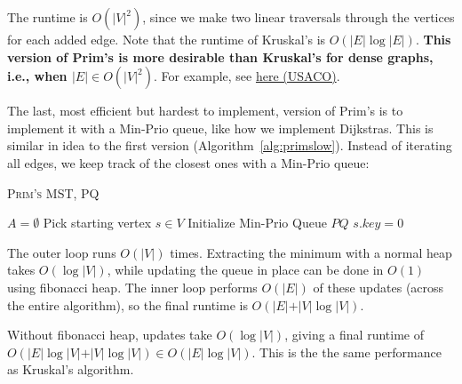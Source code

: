 The runtime is $O(\vert V\vert^2)$, since we make two linear traversals through the vertices for each added edge. Note that the runtime of Kruskal's is $O(\vert E\vert \log{\vert E\vert})$. \textbf{This version of Prim's is more desirable than Kruskal's for dense graphs, i.e., when $\vert E\vert \in O(\vert V\vert^2)$}. For example, see \href{http://www.usaco.org/current/data/sol_walk_gold_open19.html}{here (USACO)}. \V

The last, most efficient but hardest to implement, version of Prim's is to implement it with a Min-Prio queue, like how we implement Dijkstras. This is similar in idea to the first version (Algorithm~\ref{alg:primslow}). Instead of iterating all edges, we keep track of the closest ones with a Min-Prio queue:\medskip

\begin{algorithm}[H]
\DontPrintSemicolon
\SetNoFillComment

\caption{\textsc{Prim's MST, PQ}}\label{alg:primPQ}
$A = \emptyset$\;
Pick starting vertex $s\in V$\;
Initialize Min-Prio Queue $PQ$\;
$s.key=0$\;
\;
\end{algorithm}\medskip

The outer loop runs $O(\vert V\vert)$ times. Extracting the minimum with a normal heap takes $O(\log \vert V\vert)$, while updating the queue in place can be done in $O(1)$ using fibonacci heap. The inner loop performs $O(\vert E\vert)$ of these updates (across the entire algorithm), so the final runtime is $O(\vert E\vert + \vert V\vert\log{\vert V\vert})$. 

Without fibonacci heap, updates take $O(\log \vert V\vert)$, giving a final runtime of\\ $O(\vert E\vert\log \vert V\vert + \vert V\vert\log \vert V\vert)\in O(\vert E\vert\log \vert V\vert)$. This is the the same performance as Kruskal's algorithm. 

